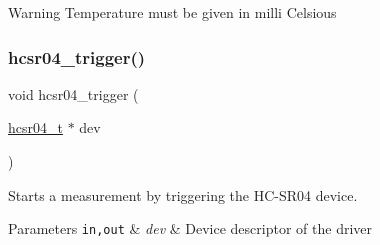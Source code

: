 \begin{DoxyWarning}{Warning}
Temperature must be given in milli Celsious 
\end{DoxyWarning}
\mbox{\label{group__drivers__hcsr04_gabbfe6e650342e8cc67cf9c9e81b29335}} 
\subsubsection{\texorpdfstring{hcsr04\+\_\+trigger()}{hcsr04\_trigger()}}
{\footnotesize\ttfamily void hcsr04\+\_\+trigger (\begin{DoxyParamCaption}\item[{\hyperlink{structhcsr04__t}{hcsr04\+\_\+t} $\ast$}]{dev }\end{DoxyParamCaption})}



Starts a measurement by triggering the H\+C-\/\+S\+R04 device. 


\begin{DoxyParams}[1]{Parameters}
\mbox{\tt in,out}  & {\em dev} & Device descriptor of the driver \\
\hline
\end{DoxyParams}
